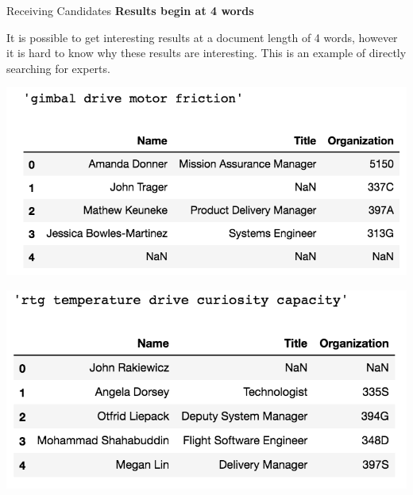 \documentclass[10pt]{beamer}
\begin{document}
\begin{frame}{Receiving Candidates}
  {\bf Results begin at 4 words}

  It is possible to get interesting results at a document length of 4 words,
  however it is hard to know why these results are interesting.
  This is an example of directly searching for experts.

  \begin{multicols}{2}
    \includegraphics[width=\columnwidth]{query1.png}

    \includegraphics[width=\columnwidth]{query2.png}
  \end{multicols}


\end{frame}
\end{document}
